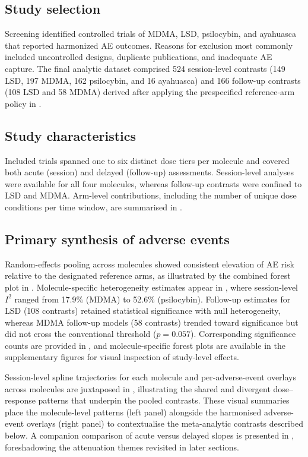\subsection{Study selection}
Screening identified controlled trials of MDMA, LSD, psilocybin, and ayahuasca that reported harmonized AE outcomes. Reasons for exclusion most commonly included uncontrolled designs, duplicate publications, and inadequate AE capture. The final analytic dataset comprised 524 session-level contrasts (149 LSD, 197 MDMA, 162 psilocybin, and 16 ayahuasca) and 166 follow-up contrasts (108 LSD and 58 MDMA) derived after applying the prespecified reference-arm policy in .

\subsection{Study characteristics}
Included trials spanned one to six distinct dose tiers per molecule and covered both acute (session) and delayed (follow-up) assessments. Session-level analyses were available for all four molecules, whereas follow-up contrasts were confined to LSD and MDMA. Arm-level contributions, including the number of unique dose conditions per time window, are summarised in .

\subsection{Primary synthesis of adverse events}
Random-effects pooling across molecules showed consistent elevation of AE risk relative to the designated reference arms, as illustrated by the combined forest plot in . Molecule-specific heterogeneity estimates appear in , where session-level $I^2$ ranged from 17.9\% (MDMA) to 52.6\% (psilocybin). Follow-up estimates for LSD (108 contrasts) retained statistical significance with null heterogeneity, whereas MDMA follow-up models (58 contrasts) trended toward significance but did not cross the conventional threshold ($p=0.057$). Corresponding significance counts are provided in , and molecule-specific forest plots are available in the supplementary figures for visual inspection of study-level effects.

Session-level spline trajectories for each molecule and per-adverse-event overlays across molecules are juxtaposed in , illustrating the shared and divergent dose--response patterns that underpin the pooled contrasts. These visual summaries place the molecule-level patterns (left panel) alongside the harmonised adverse-event overlays (right panel) to contextualise the meta-analytic contrasts described below. A companion comparison of acute versus delayed slopes is presented in , foreshadowing the attenuation themes revisited in later sections.

